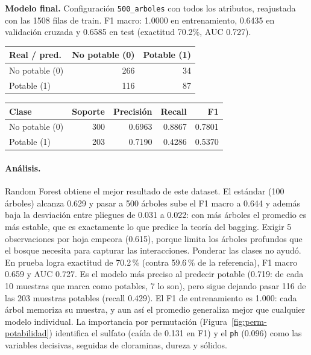 \documentclass[11pt]{article}
\begin{document}
\textbf{Modelo final.} Configuración \texttt{500\_\allowbreak{}arboles} con todos los atributos, reajustada con las 1508 filas de train. F1 macro: 1.0000 en entrenamiento, 0.6435 en validación cruzada y 0.6585 en test (exactitud 70.2\%, AUC 0.727).

\begin{table}[H]\footnotesize\begin{minipage}[t]{0.44\linewidth}\centering{}\begin{tabular}{lrr}\toprule
Real / pred. & No potable (0) & Potable (1) \\ \midrule
No potable (0) & 266 & 34 \\
Potable (1) & 116 & 87 \\
\bottomrule\end{tabular}\end{minipage}\hfill\begin{minipage}[t]{0.52\linewidth}\centering{}\begin{tabular}{lrrrr}\toprule
Clase & Soporte & Precisión & Recall & F1 \\ \midrule
No potable (0) & 300 & 0.6963 & 0.8867 & 0.7801 \\
Potable (1) & 203 & 0.7190 & 0.4286 & 0.5370 \\
\bottomrule\end{tabular}\end{minipage}\end{table}

\paragraph{Análisis.} Random Forest obtiene el mejor resultado de este dataset. El estándar (100 árboles)
alcanza 0.629 y pasar a 500 árboles sube el F1 macro a 0.644 y además baja la
desviación entre pliegues de 0.031 a 0.022: con más árboles el promedio es más estable,
que es exactamente lo que predice la teoría del bagging. Exigir 5 observaciones por
hoja empeora (0.615), porque limita los árboles profundos que el bosque necesita para
capturar las interacciones. Ponderar las clases no ayudó. En prueba logra exactitud de
70.2\,\% (contra 59.6\,\% de la referencia), F1 macro 0.659 y AUC 0.727. Es el modelo
más preciso al predecir potable (0.719: de cada 10 muestras que marca como potables,
7 lo son), pero sigue dejando pasar 116 de las 203 muestras potables (recall 0.429).
El F1 de entrenamiento es 1.000: cada árbol memoriza su muestra, y aun así el promedio
generaliza mejor que cualquier modelo individual. La importancia por permutación
(Figura~\ref{fig:perm-potabilidad}) identifica el sulfato (caída de 0.131 en F1) y el
\texttt{ph} (0.096) como las variables decisivas, seguidas de cloraminas, dureza y
sólidos.
\end{document}

